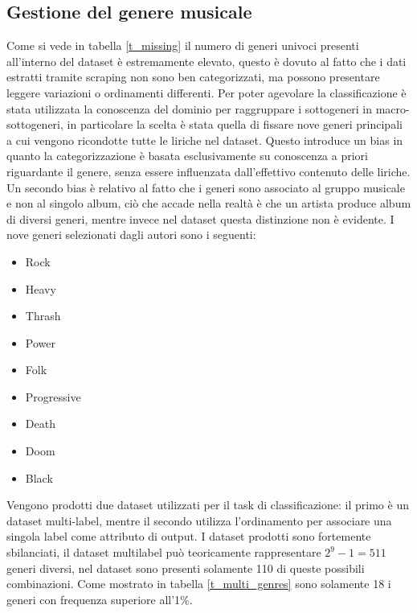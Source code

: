 \documentclass[technote]{IEEEtran}
\begin{document}
\subsection{Gestione del genere musicale}
Come si vede in tabella \ref{t_missing} il numero di generi univoci presenti
all'interno del dataset è estremamente elevato, questo è dovuto al fatto che i dati
estratti tramite scraping non sono ben categorizzati, ma possono presentare
leggere variazioni o ordinamenti differenti.
Per poter agevolare la classificazione è stata utilizzata la
conoscenza del dominio per raggruppare i sottogeneri in macro-sottogeneri,
in particolare la scelta è stata quella di fissare nove generi principali
a cui vengono ricondotte tutte le liriche nel dataset. Questo introduce
un bias in quanto la categorizzazione è basata esclusivamente
su conoscenza a priori riguardante il genere, senza essere influenzata
dall'effettivo contenuto delle liriche.
Un secondo bias è relativo al fatto che i generi sono associato al
gruppo musicale e non al singolo album, ciò che accade nella realtà è
che un artista produce album di diversi generi, mentre invece nel dataset
questa distinzione non è evidente.\newpage
I nove generi selezionati dagli autori sono i seguenti:
\begin{itemize}
\item Rock
\item Heavy
\item Thrash
\item Power
\item Folk
\item Progressive
\item Death
\item Doom
\item Black
\end{itemize}
Vengono prodotti due dataset utilizzati per il task di classificazione:
il primo è un dataset multi-label, mentre il secondo utilizza l'ordinamento
per associare una singola label come attributo di output.
I dataset prodotti sono fortemente sbilanciati, il dataset
multilabel può teoricamente rappresentare $ 2^9 - 1 = 511 $ generi
diversi, nel dataset sono presenti solamente 110 di queste
possibili combinazioni. Come mostrato in tabella \ref{t_multi_genres} sono
solamente 18 i generi con frequenza superiore all'1\%.
\end{document}
